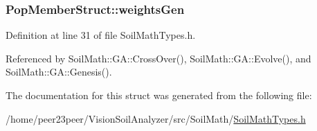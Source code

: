 \hypertarget{struct_pop_member_struct_a072fadb4863e0cf77b55ad3b46b62522}{}
\subsubsection[{weights\+Gen}]{ Pop\+Member\+Struct\+::weights\+Gen}\label{struct_pop_member_struct_a072fadb4863e0cf77b55ad3b46b62522}


Definition at line 31 of file Soil\+Math\+Types.\+h.



Referenced by Soil\+Math\+::\+G\+A\+::\+Cross\+Over(), Soil\+Math\+::\+G\+A\+::\+Evolve(), and Soil\+Math\+::\+G\+A\+::\+Genesis().



The documentation for this struct was generated from the following file\+:\begin{DoxyCompactItemize}
\item 
/home/peer23peer/\+Vision\+Soil\+Analyzer/src/\+Soil\+Math/\hyperlink{_soil_math_types_8h}{Soil\+Math\+Types.\+h}\end{DoxyCompactItemize}
